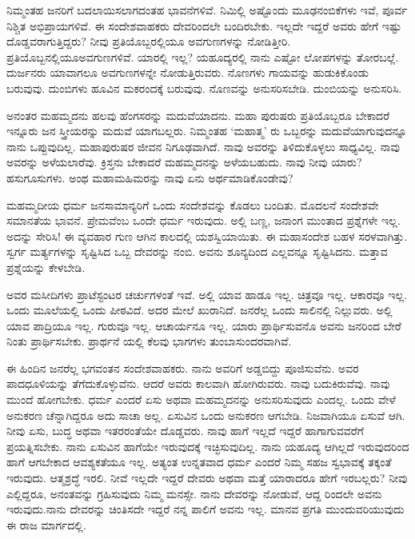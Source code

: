 ನಿಮ್ಮಂತಹ ಜನರಿಗೆ ಬದಲಾಯಿಸಲಾಗದಂತಹ ಭಾವನೆಗಳಿವೆ. ನಿಮಿಲ್ಲಿ ಅಷ್ಟೊಂದು ಮೂಢನಂಬಿಕೆಗಳು ಇವೆ, ಪೂರ್ವ ನಿಶ್ಚಿತ ಅಭಿಪ್ರಾಯಗಳಿವೆ. ಈ ಸಂದೇಶವಾಹಕರು ದೇವರಿಂದಲೇ ಬಂದಿರಬೇಕು. ಇಲ್ಲದೇ ಇದ್ದರೆ ಅವರು ಹೇಗೆ ಇಷ್ಟು ದೊಡ್ಡವರಾಗುತ್ತಿದ್ದರು? ನೀವು ಪ್ರತಿಯೊಬ್ಬರಲ್ಲಿಯೂ ಅವಗುಣಗಳನ್ನು ನೋಡಿತ್ತೀರಿ. ಪ್ರತಿಯೊಬ್ಬನಲ್ಲಿಯೂ\break ಅವಗುಣಗಳಿವೆ. ಯಾರಲ್ಲಿ ಇಲ್ಲ? ಯಹೂದ್ಯರಲ್ಲಿ ನಾನು ಎಷ್ಟೋ ಲೋಪಗಳನ್ನು ತೋರಬಲ್ಲೆ. ದುರ್ಜನರು ಯಾವಾಗಲೂ ಅವಗುಣಗಳನ್ನೇ ನೋಡುತ್ತಿರುವರು. ನೊಣಗಳು ಗಾಯವನ್ನು ಹುಡುಕಿಕೊಂಡು ಬರುವುವು. ದುಂಬಿಗಳು ಹೂವಿನ ಮಕರಂದಕ್ಕೆ ಬರುವುವು. ನೊಣವನ್ನು ಅನುಸರಿಸಬೇಡಿ. ದುಂಬಿಯನ್ನು ಅನುಸರಿಸಿ.

ಅನಂತರ ಮಹಮ್ಮದನು ಹಲವು ಹೆಂಗಸರನ್ನು ಮದುವೆಯಾದನು. ಮಹಾ ಪುರುಷರು ಪ್ರತಿಯೊಬ್ಬರೂ ಬೇಕಾದರೆ ಇನ್ನೂರು ಜನ ಸ್ತ್ರೀಯರನ್ನು ಮದುವೆ ಯಾಗಬಲ್ಲರು. ನಿಮ್ಮಂತಹ ‘ಮಹಾತ್ಮ’ ರು ಒಬ್ಬರನ್ನು ಮದುವೆಯಾಗುವುದನ್ನೂ ನಾನು ಒಪ್ಪುವುದಿಲ್ಲ. ಮಹಾಪುರುಷರ ಜೀವನ ನಿಗೂಢವಾಗಿದೆ. ನಾವು ಅವರನ್ನು ತಿಳಿದುಕೊಳ್ಳಲು ಸಾಧ್ಯವಿಲ್ಲ. ನಾವು ಅವರನ್ನು ಅಳೆಯಲಾರೆವು. ಕ್ರಿಸ್ತನು ಬೇಕಾದರೆ ಮಹಮ್ಮದನನ್ನು ಅಳೆಯಬಹುದು. ನಾವು ನೀವು ಯಾರು? ಹಸುಗೂಸುಗಳು. ಅಂಥ ಮಹಾಮಹಿಮರನ್ನು ನಾವು ಏನು ಅರ್ಥಮಾಡಿಕೊಂಡೇವು?

ಮಹಮ್ಮದೀಯ ಧರ್ಮ ಜನಸಾಮಾನ್ಯರಿಗೆ ಒಂದು ಸಂದೇಶವನ್ನು ಕೊಡಲು ಬಂದಿತು. ಮೊದಲನೆ ಸಂದೇಶವೇ ಸಮಾನತೆಯ ಭಾವನೆ. ಪ್ರೇಮವೆಂಬ ಒಂದೇ ಧರ್ಮ ಇರುವುದು. ಅಲ್ಲಿ ಬಣ್ಣ, ಜನಾಂಗ ಮುಂತಾದ ಪ್ರಶ್ನೆಗಳೇ ಇಲ್ಲ. ಅದನ್ನು ಸೇರಿಸಿ! ಈ ವ್ಯವಹಾರ ಗುಣ ಆಗಿನ ಕಾಲದಲ್ಲಿ ಯಶಸ್ವಿಯಾಯಿತು. ಈ ಮಹಾಸಂದೇಶ ಬಹಳ ಸರಳವಾಗಿತ್ತು. ಸ್ವರ್ಗ ಮರ್ತ್ಯಗಳನ್ನು ಸೃಷ್ಟಿಸಿದ ಒಬ್ಬ ದೇವರನ್ನು ನಂಬಿ. ಅವನು ಶೂನ್ಯದಿಂದ ಎಲ್ಲವನ್ನೂ ಸೃಷ್ಟಿಸಿದನು. ಮತ್ತಾವ ಪ್ರಶ್ನೆಯನ್ನು ಕೇಳಬೇಡಿ.

ಅವರ ಮಸೀದಿಗಳು ಪ್ರಾಟೆಸ್ಟಂಟರ ಚರ್ಚುಗಳಂತೆ ಇವೆ. ಅಲ್ಲಿ ಯಾವ ಹಾಡೂ ಇಲ್ಲ. ಚಿತ್ರವೂ ಇಲ್ಲ. ಆಕಾರವೂ ಇಲ್ಲ. ಒಂದು ಮೂಲೆಯಲ್ಲಿ ಒಂದು ಪೀಠವಿದೆ. ಅದರ ಮೇಲೆ ಖುರಾನಿದೆ. ಜನರೆಲ್ಲ ಒಂದು ಸಾಲಿನಲ್ಲಿ ನಿಲ್ಲುವರು. ಅಲ್ಲಿ ಯಾವ ಪಾದ್ರಿಯೂ ಇಲ್ಲ. ಗುರುವೂ ಇಲ್ಲ. ಆಚಾರ್ಯನೂ ಇಲ್ಲ. ಯಾರು ಪ್ರಾರ್ಥಿಸುವನೊ ಅವನು ಜನರಿಂದ ಬೇರೆ ನಿಂತು ಪ್ರಾರ್ಥಿಸಬೇಕು. ಪ್ರಾರ್ಥನೆ ಯಲ್ಲಿ ಕೆಲವು ಭಾಗಗಳು ತುಂಬಾ\break ಸುಂದರವಾಗಿವೆ.

ಈ ಹಿಂದಿನ ಜನರೆಲ್ಲ ಭಗವಂತನ ಸಂದೇಶವಾಹಕರು. ನಾನು ಅವರಿಗೆ ಅಡ್ಡಬಿದ್ದು ಪೂಜಿಸುವೆನು. ಅವರ ಪಾದಧೂಳಿಯನ್ನು ತೆಗೆದುಕೊಳ್ಳುವೆನು. ಆದರೆ ಅವರು ಕಾಲವಾಗಿ ಹೋಗಿರುವರು. ನಾವು ಬದುಕಿರುವೆವು. ನಾವು ಮುಂದೆ ಹೋಗಬೇಕು. ಧರ್ಮ ಎಂದರೆ ಏಸು ಅಥವಾ ಮಹಮ್ಮದನನ್ನು ಅನುಸರಿಸುವುದು ಎಂದಲ್ಲ. ಒಂದು ವೇಳೆ ಅನುಕರಣ ಚೆನ್ನಾಗಿದ್ದರೂ ಅದು ಸಾಚಾ ಅಲ್ಲ. ಏಸುವಿನ ಒಂದು ಅನುಕರಣ ಆಗಬೇಡಿ. ನಿಜವಾಗಿಯೂ ಏಸುವೆ ಆಗಿ. ನೀವು ಏಸು, ಬುದ್ಧ ಅಥವಾ ಇತರರಂತೆಯೇ ದೊಡ್ಡವರು. ನಾವು ಹಾಗೆ ಇಲ್ಲದೆ ಇದ್ದರೆ ಹಾಗಾಗುವವರೆಗೆ ಪ್ರಯತ್ನಿಸಬೇಕು. ನಾನು ಏಸುವಿನ ಹಾಗೆಯೇ ಇರುವುದಕ್ಕೆ ಇಚ್ಛಿಸುವುದಿಲ್ಲ. ನಾನು ಯಹೂದ್ಯ ಆಗಿಲ್ಲದೆ ಇರುವುದರಿಂದ ಹಾಗೆ ಆಗಬೇಕಾದ ಆವಶ್ಯಕತೆಯೂ ಇಲ್ಲ. ಅತ್ಯಂತ ಉನ್ನತವಾದ ಧರ್ಮ ಎಂದರೆ ನಿಮ್ಮ ಸಹಜ ಸ್ವಭಾವಕ್ಕೆ ತಕ್ಕಂತೆ ಇರುವುದು. ಆತ್ಮಶ್ರದ್ಧೆ ಇರಲಿ. ನೀವೆ ಇಲ್ಲದೇ ಇದ್ದರೆ ದೇವರು ಅಥವಾ ಮತ್ತೆ ಯಾರಾದರೂ ಹೇಗೆ ಇರಬಲ್ಲರು? ನೀವು ಎಲ್ಲಿದ್ದರೂ, ಅನಂತವನ್ನು ಗ್ರಹಿಸುವುದು ನಿಮ್ಮ ಮನಸ್ಸೇ. ನಾನು ದೇವರನ್ನು ನೋಡುವೆ, ಆದ್ದ ರಿಂದಲೇ ಅವನು ಇರುವುದು.ನಾನು ದೇವರನ್ನು ಚಿಂತಿಸದೇ ಇದ್ದರೆ ನನ್ನ ಪಾಲಿಗೆ ಅವನು ಇಲ್ಲ. ಮಾನವ ಪ್ರಗತಿ ಮುಂದುವರಿಯುವುದು ಈ ರಾಜ ಮಾರ್ಗದಲ್ಲಿ.

